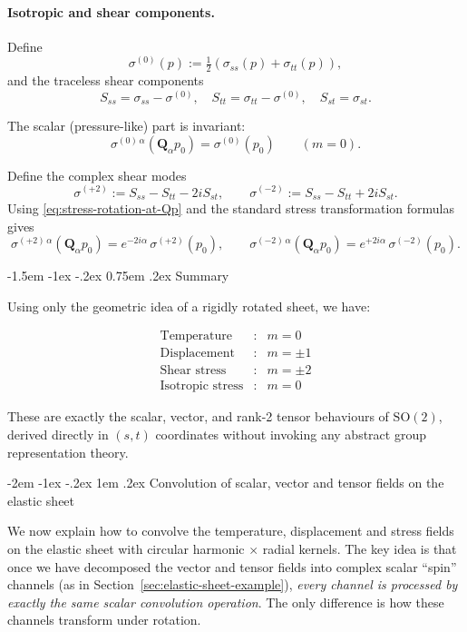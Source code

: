 \documentclass[12pt]{article}
\makeatletter
\renewcommand\section{\@startsection {section}{1}{\z@}%
                                   {-2em \@plus -1ex \@minus -.2ex}%
                                   {1em \@plus.2ex}%
                                   {\normalfont\Large\bfseries}}
\renewcommand\subsection{\@startsection{subsection}{2}{\z@}%
                                     {-1.5em \@plus -1ex \@minus -.2ex}%
                                     {0.75em \@plus .2ex}%
                                     {\normalfont\large\bfseries}}
\makeatother
\begin{document}
\paragraph{Isotropic and shear components.}
Define
\[
  \sigma^{(0)}(p) := \tfrac12(\sigma_{ss}(p)+\sigma_{tt}(p)),
\]
and the traceless shear components
\[
  S_{ss}=\sigma_{ss}-\sigma^{(0)},\quad
  S_{tt}=\sigma_{tt}-\sigma^{(0)},\quad
  S_{st}=\sigma_{st}.
\]

The scalar (pressure-like) part is invariant:
\[
  \sigma^{(0)\,\alpha}(\mathbf{Q}_\alpha p_0)
  = \sigma^{(0)}(p_0)
  \qquad (m=0).
\]

Define the complex shear modes
\[
  \sigma^{(+2)} := S_{ss}-S_{tt} - 2iS_{st},
  \qquad
  \sigma^{(-2)} := S_{ss}-S_{tt} + 2iS_{st}.
\]
Using \eqref{eq:stress-rotation-at-Qp} and the standard stress
transformation formulas gives
\[
  \sigma^{(+2)\,\alpha}(\mathbf{Q}_\alpha p_0)
  = e^{-2i\alpha}\,\sigma^{(+2)}(p_0),
\qquad
  \sigma^{(-2)\,\alpha}(\mathbf{Q}_\alpha p_0)
  = e^{+2i\alpha}\,\sigma^{(-2)}(p_0).
\]

\subsection{Summary}

Using only the geometric idea of a rigidly rotated sheet, we have:

\[
\begin{array}{ccl}
\text{Temperature} &:& m=0 \\
\text{Displacement} &:& m=\pm 1 \\
\text{Shear stress} &:& m=\pm 2 \\
\text{Isotropic stress} &:& m=0
\end{array}
\]

These are exactly the scalar, vector, and rank-2 tensor behaviours of
$\mathrm{SO}(2)$, derived directly in $(s,t)$ coordinates without
invoking any abstract group representation theory.










\section{Convolution of scalar, vector and tensor fields on the elastic sheet}
\label{sec:elastic-sheet-convolution}

We now explain how to convolve the temperature, displacement and
stress fields on the elastic sheet with circular harmonic $\times$
radial kernels. The key idea is that once we have decomposed the
vector and tensor fields into complex scalar ``spin'' channels (as in
Section~\ref{sec:elastic-sheet-example}), \emph{every channel is
processed by exactly the same scalar convolution operation}. The only
difference is how these channels transform under rotation.
\end{document}
